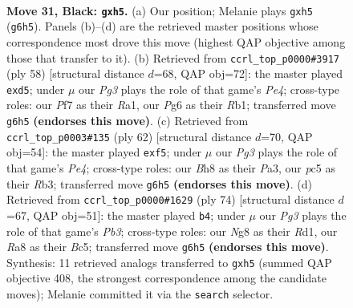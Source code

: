 \documentclass[11pt]{article}
\begin{document}
\clearpage

\begin{figure}[p]\centering
\begin{subfigure}{0.46\textwidth}\centering
\resizebox{\linewidth}{!}{%
\newchessgame
\chessboard[
  setfen={rrk3nb/p4p1p/P1p3p1/2P4P/4PN2/8/5B2/3R1RK1 b - - 0 31},
  showmover=false,
  pgfstyle=straightmove, color=movearrow, markmove={g6-h5}
]}
\caption{}
\end{subfigure}\hfill
\begin{subfigure}{0.46\textwidth}\centering
\resizebox{\linewidth}{!}{%
\newchessgame
\chessboard[
  setfen={1r3r1k/p4p2/P3pn1p/3p4/3PP2P/3K2P1/7N/RR6 w - - 0 30},
  showmover=false,
  pgfstyle=straightmove, color=movearrow, markmove={e4-d5}
]}
\caption{}
\end{subfigure}
\\[4pt]
\begin{subfigure}{0.46\textwidth}\centering
\resizebox{\linewidth}{!}{%
\newchessgame
\chessboard[
  setfen={5rrk/p7/3p4/2p1np1P/2PpP3/PR1P3N/5P2/1R3K2 w - - 0 32},
  showmover=false,
  pgfstyle=straightmove, color=movearrow, markmove={e4-f5}
]}
\caption{}
\end{subfigure}\hfill
\begin{subfigure}{0.46\textwidth}\centering
\resizebox{\linewidth}{!}{%
\newchessgame
\chessboard[
  setfen={1r5r/5pk1/3Ppb2/2B4p/2p5/1P3Pp1/P5P1/3RR1K1 w - - 1 38},
  showmover=false,
  pgfstyle=straightmove, color=movearrow, markmove={b3-b4}
]}
\caption{}
\end{subfigure}
\caption{\textbf{Move 31, Black: \texttt{gxh5}.} (a) Our position; Melanie plays \texttt{gxh5} (\texttt{g6h5}). Panels (b)--(d) are the retrieved master positions whose correspondence most drove this move (highest QAP objective among those that transfer to it). (b) Retrieved from \texttt{ccrl\_top\_p0000\#3917} (ply 58) [structural distance $d$=68, QAP obj=72]: the master played \texttt{exd5}; under $\mu$ our \emph{Pg3} plays the role of that game's \emph{Pe4}; cross-type roles: our \emph{P}f7 as their \emph{R}a1, our \emph{P}g6 as their \emph{R}b1; transferred move \texttt{g6h5} \textbf{(endorses this move)}. (c) Retrieved from \texttt{ccrl\_top\_p0003\#135} (ply 62) [structural distance $d$=70, QAP obj=54]: the master played \texttt{exf5}; under $\mu$ our \emph{Pg3} plays the role of that game's \emph{Pe4}; cross-type roles: our \emph{B}h8 as their \emph{P}a3, our \emph{p}c5 as their \emph{R}b3; transferred move \texttt{g6h5} \textbf{(endorses this move)}. (d) Retrieved from \texttt{ccrl\_top\_p0000\#1629} (ply 74) [structural distance $d$=67, QAP obj=51]: the master played \texttt{b4}; under $\mu$ our \emph{Pg3} plays the role of that game's \emph{Pb3}; cross-type roles: our \emph{N}g8 as their \emph{R}d1, our \emph{R}a8 as their \emph{B}c5; transferred move \texttt{g6h5} \textbf{(endorses this move)}. Synthesis: 11 retrieved analogs transferred to \texttt{gxh5} (summed QAP objective 408, the strongest correspondence among the candidate moves); Melanie committed it via the \texttt{search} selector.}
\label{fig:thought-m61}
\end{figure}
\end{document}
